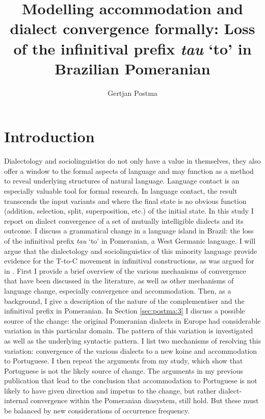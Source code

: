 \documentclass[output=paper,hidelinks,draftmode]{langscibook}
\title{Modelling accommodation and dialect convergence formally: Loss of the infinitival prefix \textit{tau} `to' in Brazilian Pomeranian}
\author{Gertjan Postma\affiliation{Meertens Institute Amsterdam}}
\begin{document}
\maketitle

\section{Introduction}


Dialectology and sociolinguistics do not only have a value in themselves, they also offer a window to the formal aspects of language and may function as a method to reveal underlying structures of natural language. Language contact is an especially valuable tool for formal research. In language contact, the result transcends the input variants and where the final state is no obvious function (addition, selection, split, superposition, etc.) of the initial state. In this study I report on dialect convergence of a set of mutually intelligible dialects and its outcome. I discuss a grammatical change in a language island in Brazil: the loss of the infinitival prefix \textit{tau} `to' in Pomeranian, a West Germanic language. I will argue that the dialectology and sociolinguistics of this minority language provide evidence for the T-to-C movement in infinitival constructions, as was argued for in \citet{Pesetsky2007}. First I provide a brief overview of the various mechanisms of convergence that have been discussed in the literature, as well as other mechanisms of language change, especially convergence and accommodation. Then, as a background, I give a description of the nature of the complementiser and the infinitival prefix in Pomeranian. In Section \ref{sec:postma:3} I discuss a possible source of the change: the original Pomeranian dialects in Europe had considerable variation in this particular domain. The pattern of this variation is investigated as well as the underlying syntactic pattern. I list two mechanisms of resolving this variation: convergence of the various dialects to a new koine and accommodation to Portuguese. I then repeat the arguments from my \citeyear{Postma2016} study, which show that Portuguese is not the likely source of change. The arguments in my previous publication that lead to the conclusion that accommodation to Portuguese is not likely to have given direction and impetus to the change, but rather dialect-internal convergence within the Pomeranian diasystem, still hold. But these must be balanced by new considerations of occurrence frequency.
\end{document}
